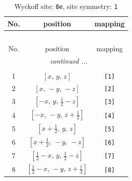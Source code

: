 \documentclass[fleqn,8pt]{jsarticle}
\begin{document}
\renewcommand{\arraystretch}{1.2}
\begin{longtable}{ccc}
\caption{Wyckoff site: {\tt 8e}, site symmetry: {\tt 1}}
 \\
 \hline \hline
No. & position & mapping \\ \hline \endfirsthead

\multicolumn{2}{l}{\tablename\ \thetable{}} \\
 \hline \hline
No. & position & mapping \\ \hline \endhead

 \hline \hline
\multicolumn{2}{r}{\footnotesize\it continued ...} \\ \endfoot

 \hline \hline
\multicolumn{2}{r}{} \\ \endlastfoot

1 & $\left[ x,\, y,\, z \right]$ & {\tt [1]} \\ \hline
2 & $\left[ x,\, - y,\, - z \right]$ & {\tt [2]} \\ \hline
3 & $\left[ - x,\, y,\, \frac{1}{2} - z \right]$ & {\tt [3]} \\ \hline
4 & $\left[ - x,\, - y,\, z + \frac{1}{2} \right]$ & {\tt [4]} \\ \hline
5 & $\left[ x + \frac{1}{2},\, y,\, z \right]$ & {\tt [5]} \\ \hline
6 & $\left[ x + \frac{1}{2},\, - y,\, - z \right]$ & {\tt [6]} \\ \hline
7 & $\left[ \frac{1}{2} - x,\, y,\, \frac{1}{2} - z \right]$ & {\tt [7]} \\ \hline
8 & $\left[ \frac{1}{2} - x,\, - y,\, z + \frac{1}{2} \right]$ & {\tt [8]} \\
\end{longtable}
\end{document}
